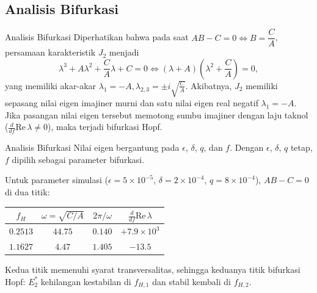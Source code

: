 \documentclass[aspectratio=169]{beamer}
\begin{document}
\subsection{Analisis Bifurkasi}

\begin{frame}{Analisis Bifurkasi}
    Diperhatikan bahwa pada saat $AB - C = 0 \iff B = \dfrac{C}{A}$, persamaan karakteristik $J_2$ menjadi
\begin{equation*}
    \lambda^3 + A\lambda^2 + \dfrac{C}{A}\lambda + C=0 \iff (\lambda + A)\left(\lambda^2 + \dfrac{C}{A}\right) = 0,
\end{equation*}
yang memiliki akar-akar $\lambda_1 = -A, \lambda_{2,3}=\pm i\sqrt{\frac{C}{A}}$. Akibatnya, $J_2$ memiliki sepasang nilai eigen imajiner murni dan satu nilai eigen real negatif $\lambda_1 = -A$.
Jika pasangan nilai eigen tersebut memotong sumbu imajiner dengan laju taknol
($\tfrac{d}{df}\mathrm{Re}\,\lambda \neq 0$), maka terjadi bifurkasi Hopf.
\end{frame}

\begin{frame}{Analisis Bifurkasi}
    Nilai eigen bergantung pada $\epsilon$, $\delta$, $q$, dan $f$. Dengan $\epsilon$, $\delta$, $q$ tetap,
    $f$ dipilih sebagai parameter bifurkasi.

    \medskip
    Untuk parameter simulasi ($\epsilon = 5\times10^{-5}$, $\delta = 2\times10^{-4}$, $q = 8\times10^{-4}$),
    $AB - C = 0$ di dua titik:
    \begin{center}
    \begin{tabular}{cccc}
        \toprule
        $f_H$ & $\omega = \sqrt{C/A}$ & $2\pi/\omega$ & $\tfrac{d}{df}\mathrm{Re}\,\lambda$ \\
        \midrule
        $0.2513$ & $44.75$ & $0.140$ & $+7.9\times10^{3}$ \\
        $1.1627$ & $4.47$ & $1.405$ & $-13.5$ \\
        \bottomrule
    \end{tabular}
    \end{center}
    Kedua titik memenuhi syarat transversalitas, sehingga keduanya titik bifurkasi Hopf:
    $E_2^*$ kehilangan kestabilan di $f_{H,1}$ dan stabil kembali di $f_{H,2}$.
\end{frame}
\end{document}
